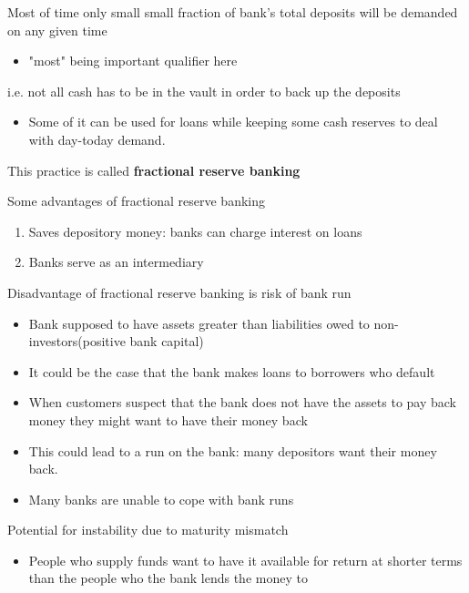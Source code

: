 \documentclass{beamer}
\begin{document}
\begin{frame}
 Most of time only small small fraction of bank's total deposits will be demanded on any given time
 \begin{itemize}
   \item "most" being important qualifier here
 \end{itemize}
 i.e. not all cash has to be in the vault in order to back up the deposits
 \begin{itemize}
   \item Some of it can be used for loans while keeping some cash reserves to deal with day-today demand. 
 \end{itemize}
This practice is called \textbf{fractional reserve banking }
\end{frame}

\begin{frame}
 Some advantages of fractional reserve banking
\begin{enumerate}
  \item Saves depository money: banks can charge interest on loans
  \item Banks serve as an intermediary  
\end{enumerate}
\end{frame}

\begin{frame}
 Disadvantage of fractional reserve banking is risk of bank run  
\begin{itemize}
  \item Bank supposed to have assets greater than liabilities owed to non-investors(positive bank capital)
  \item It could be the case that the bank makes loans to borrowers who default
  \item When customers suspect that the bank does not have the assets to pay back money they might want to have their money back
  \item This could lead to a run on the bank: many depositors want their money back. 
  \item Many banks are unable to cope with bank runs
\end{itemize}
 \medskip
 Potential for instability due to maturity mismatch
 \begin{itemize}
   \item People who supply funds want to have it available for return at shorter terms than the people who the bank lends the money to
 \end{itemize}
\end{frame}
\end{document}
